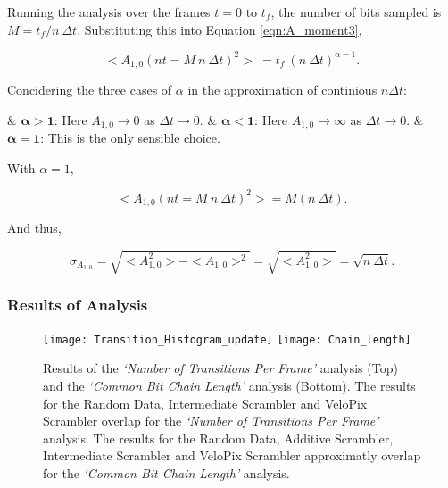 \begin{description}
					Running the analysis over the frames $t = 0$ to $t_f$, the number of bits sampled is $M = {t_f / n\ \Delta t}$. Substituting this into Equation \ref{eqn:A_moment3},

					\begin{equation}
						<A_{1,0}(nt = M\ n\ \Delta t)^2>\ = t_f\ (n\ \Delta t)^{\alpha -1}.
					\end{equation}

					Concidering the three cases of $\alpha$ in the approximation of continious $n \Delta t$:
					
					\vspace{1em}

					\begin{easylist}[itemize]
						& $\bm{\alpha > 1}$: Here $A_{1,0} \to 0$ as $\Delta t \to 0$.
						& $\bm{\alpha < 1}$: Here $A_{1,0} \to \infty$ as $\Delta t \to 0$.
						& $\bm{\alpha = 1}$: This is the only sensible choice.
					\end{easylist}
					
					\vspace{1em}

					With $\alpha =1$,

					\begin{equation}
						<A_{1,0}(nt = M\ n\ \Delta t)^2> = M (n\ \Delta t).
					\end{equation}

					And thus,

					\begin{equation}
						\sigma_{A_{1,0}} = \sqrt{<A_{1,0}^2> - <A_{1,0}>^2} = \sqrt{<A_{1,0}^2>} = \sqrt{n\ \Delta t}.
					\end{equation}

			\end{description}	

		\newpage
		\subsubsection{Results of Analysis}
		\label{subsub:algorithm_results}
			\vspace{-7mm}
			\begin{figure}[h]
				\centering
				\texttt{[image: Transition\_Histogram\_update]}
				\texttt{[image: Chain\_length]}
				\caption{Results of the \textit{`Number of Transitions Per Frame'} analysis (Top) and the \textit{`Common Bit Chain Length'} analysis (Bottom). The results for the Random Data, Intermediate Scrambler and VeloPix Scrambler overlap for the \textit{`Number of Transitions Per Frame'} analysis. The results for the Random Data, Additive Scrambler, Intermediate Scrambler and VeloPix Scrambler approximatly overlap for the \textit{`Common Bit Chain Length'} analysis.}
				\label{fig:transitions_per_frame}
			\end{figure} \FloatBarrier
			
